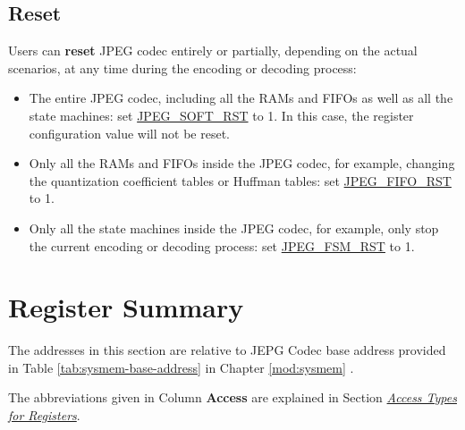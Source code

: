 \documentclass[main\_\_EN.tex]{subfiles}
\begin{document}
\subsection{Reset}
Users can \textbf{reset} JPEG codec entirely or partially, depending on the actual scenarios, at any time during the encoding or decoding process:
\begin{itemize}
    \item The entire JPEG codec, including all the RAMs and FIFOs as well as all the state machines: set \hyperref[fielddesc:JPEGSOFTRST]{JPEG\_SOFT\_RST} to 1. In this case, the register configuration value will not be reset.
    \item Only all the RAMs and FIFOs inside the JPEG codec, for example, changing the quantization coefficient tables or Huffman tables: set \hyperref[fielddesc:JPEGFIFORST]{JPEG\_FIFO\_RST} to 1.
    \item Only all the state machines inside the JPEG codec, for example, only stop the current encoding or decoding process: set \hyperref[fielddesc:JPEGFSMRST]{JPEG\_FSM\_RST} to 1.
\end{itemize}




\newpage
\hypertarget{jpegcodec-reg-summ}{}
\section{Register Summary}
\label{sec:jpegcodec-reg-summ}




The addresses in this section are relative to JEPG Codec base address provided in Table \ref{tab:sysmem-base-address} in Chapter \ref{mod:sysmem} \textit{}.

The abbreviations given in Column \textbf{Access} are explained in Section \hyperref[glossary-access-types]{\textit{Access Types for Registers}}.





\end{document}
